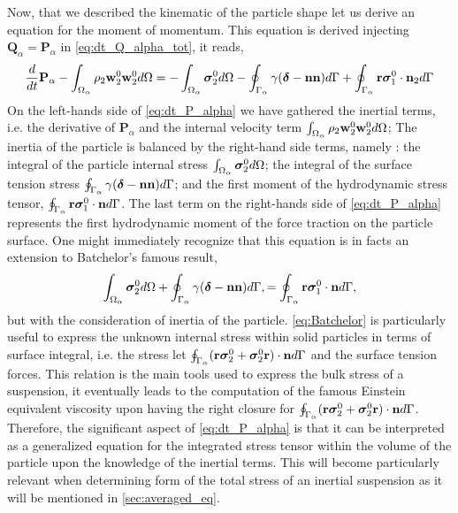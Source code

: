 Now, that we described the kinematic of the particle shape let us derive an equation for the moment of momentum. 
This equation is derived injecting $\textbf{Q}_\alpha = \textbf{P}_\alpha$ in \ref{eq:dt_Q_alpha_tot}, it reads, 
\begin{equation}
    \frac{d}{dt} {\textbf{P}_\alpha}
    - \int_{\Omega_\alpha}  \rho_2  \textbf{w}_2^0 \textbf{w}_2^0  d\Omega
    = 
    - \int_{\Omega_\alpha} \bm{\sigma}_2^0 d\Omega
    - \oint_{\Gamma_\alpha}  
        \gamma (\bm\delta - \textbf{nn})
     d\Gamma
    + \oint_{\Gamma_\alpha}  \textbf{r}\bm{\sigma}_1^0\cdot \textbf{n}_2 d\Gamma 
    \label{eq:dt_P_alpha}
\end{equation}
On the left-hands side of \ref{eq:dt_P_alpha} we have gathered the inertial terms, i.e. the derivative of $\textbf{P}_\alpha$ and the internal velocity term $\int_{\Omega_\alpha} \rho_2\textbf{w}_2^0\textbf{w}_2^0  d\Omega$; 
The inertia of the particle is balanced by the right-hand side terms, namely : 
the integral of the particle internal stress $\int_{\Omega_\alpha}  \bm{\sigma}_2^0 d\Omega$; 
the integral of the surface tension stress $\oint_{\Gamma_\alpha}  \gamma (\bm\delta- \textbf{nn})  d\Gamma$; 
and the first moment of the hydrodynamic stress tensor, $\oint_{\Gamma_\alpha} \textbf{r}\bm\sigma_1^0\cdot \textbf{n} d\Gamma$.
The last term on the right-hands side of \ref{eq:dt_P_alpha} represents the first hydrodynamic moment of the force traction on the particle surface.
One might immediately recognize that this equation is in facts an extension to Batchelor’s famous result, 
\begin{equation}
    \int_{\Omega_\alpha} \bm{\sigma}_2^0 d\Omega
    + \oint_{\Gamma_\alpha} \gamma(\bm\delta - \textbf{nn}) d\Gamma,
    = \oint_{\Gamma_\alpha} \textbf{r}\bm\sigma_1^0\cdot \textbf{n} d\Gamma,
    \label{eq:Batchelor}
\end{equation}
but with the consideration of inertia of the particle.
\ref{eq:Batchelor} is particularly useful to express the unknown internal stress within solid particles in terms of surface integral, i.e. the stress let $\oint_{\Gamma_\alpha} (\textbf{r}\bm\sigma_2^0+ \bm\sigma_2^0\textbf{r})\cdot \textbf{n} d\Gamma$ and the surface tension forces.
This relation is the main tools used to express the bulk stress of a suspension, it eventually leads to the computation of the famous Einstein equivalent viscosity upon having the right closure for $\oint_{\Gamma_\alpha} (\textbf{r}\bm\sigma_2^0+ \bm\sigma_2^0\textbf{r})\cdot \textbf{n} d\Gamma$. 
Therefore, the significant aspect of \ref{eq:dt_P_alpha} is that it can be interpreted as a generalized equation for the integrated stress tensor within the volume of the particle upon the knowledge of the inertial terms.
This will become particularly relevant when determining form of the total stress of an inertial suspension as it will be mentioned in \ref{sec:averaged_eq}.

